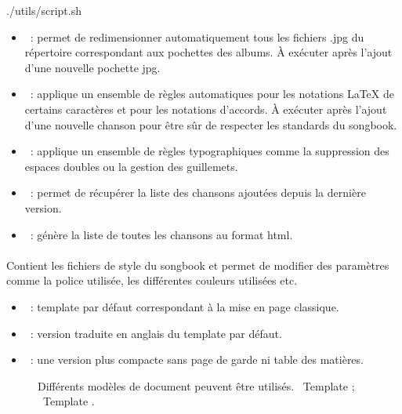 \begin{unix}
  ./utils/script.sh
\end{unix}

\begin{itemize}
\item {}~: permet de redimensionner
  automatiquement tous les fichiers .jpg du répertoire
   correspondant aux pochettes des albums. À
  exécuter après l'ajout d'une nouvelle pochette jpg.

\item {}~: applique un ensemble de règles
  automatiques pour les notations \LaTeX{} de certains caractères et
  pour les notations d'accords.  À exécuter après l'ajout d'une
  nouvelle chanson pour être sûr de respecter les standards du
  songbook.

\item {}~: applique un ensemble de règles typographiques
  comme la suppression des espaces doubles ou la gestion des
  guillemets.

\item {}~: permet de récupérer la liste des
  chansons ajoutées depuis la dernière version.

\item {}~: génère la liste de toutes les chansons au
  format html.
\end{itemize}

\paragraph{}
Contient les fichiers de style du songbook et permet de modifier des
paramètres comme la police utilisée, les différentes couleurs
utilisées etc.

\begin{itemize}
\item {}~: template par défaut correspondant à la
  mise en page classique.
\item {}~: version traduite en anglais du
  template par défaut.
\item {}~: une version plus compacte sans page de
  garde ni table des matières.
\end{itemize}

\begin{figure}
  \centering
  \hspace{0.1cm}%
  \caption[Templates]{%
    Différents modèles de document peuvent être utilisés.
    ~Template ; %
    ~Template .%
  }%
  \label{fig:fenetre-pointel-2}
\end{figure}


